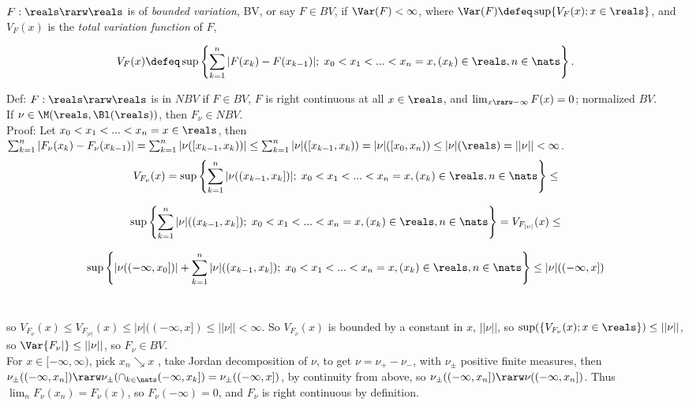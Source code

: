 $F: \reals \rarw \reals$ is of \emph{bounded variation}, BV, or say $F \in BV$, if $\Var(F) < \infty$, where $\Var(F) \defeq \sup\{ V_F(x); x \in \reals \}$, and $V_F(x)$ is the \emph{total variation function} of $F$,

$$
V_F(x) \defeq \sup \left\{  \sum_{k=1}^n |F(x_k) - F(x_{k-1})| ; \;  x_0    < x_1 < ... < x_n=x, ( x_k ) \in \reals, n \in \nats \right\}.
$$

Def: $F: \reals \rarw \reals$ is in $NBV$ if $F \in BV$, $F$ is right continuous at all $x \in \reals$, and $\lim_{x \rarw -\infty} F(x) = 0$; normalized $BV$.\\

If $\nu \in \M(\reals, \Bl(\reals))$, then $F_\nu \in NBV$. \\

\noindent
Proof: Let $x_0 < x_1 < ... < x_n = x \in \reals$, then $\sum_{k=1}^n |F_\nu(x_k) - F_\nu(x_{k-1})| = \sum_{k=1}^n |\nu([x_{k-1}, x_{k}))| \le \sum_{k=1}^n |\nu|([x_{k-1}, x_{k})) = |\nu|([x_0,x_n)) \le |\nu|(\reals) = ||\nu|| < \infty$. \\




$$
V_{F_\nu}(x) = \sup \left\{  \sum_{k=1}^n | \nu(( x_{k-1},x_k ]) | ; \;  x_0    < x_1 < ... < x_n=x, ( x_k ) \in \reals, n \in \nats \right\} \le 
$$

$$
\sup \left\{  \sum_{k=1}^n |\nu|(( x_{k-1},x_k ]) ; \;  x_0    < x_1 < ... < x_n=x, ( x_k ) \in \reals, n \in \nats \right\}  = V_{F_{|\nu|}}(x)  \le 
$$

$$ \sup \left\{  |\nu((-\infty,x_0])| + \sum_{k=1}^n | \nu | (( x_{k-1},x_k ]); \;  x_0    < x_1 < ... < x_n=x, ( x_k ) \in \reals, n \in \nats \right\} \le |\nu|((-\infty,x])
$$  \\


\noindent

so $ V_{F_\nu}(x) \le V_{F_{|\nu|}}(x)  \le  |\nu|((-\infty,x]) \le ||\nu|| < \infty$. So $V_{F_\nu}(x)$ is bounded by a constant in $x$, $||\nu||$, so $\sup(\{ V_{F_\nu}(x); x \in \reals \}) \le ||\nu||$, so $\Var{F_\nu|} \le ||\nu||$, so $F_\nu \in BV$.   \\

For $x \in [-\infty,\infty)$, pick $x_n \searrow x$ , take Jordan decomposition of $\nu$, to get $\nu = \nu_+ - \nu_-$, with $\nu_\pm$ positive finite measures, then $\nu_\pm((-\infty,x_n]) \rarw \nu_\pm(\cap_{k \in \nats} (-\infty,x_k]) = \nu_\pm((-\infty,x]) $, by continuity from above, so $\nu_\pm((-\infty,x_n]) \rarw \nu((-\infty,x_n])$. Thus $\lim_n F_\nu(x_n) = F_\nu(x)$, so $F_\nu(-\infty) = 0$, and $F_\nu$ is right continuous by definition.  \\









